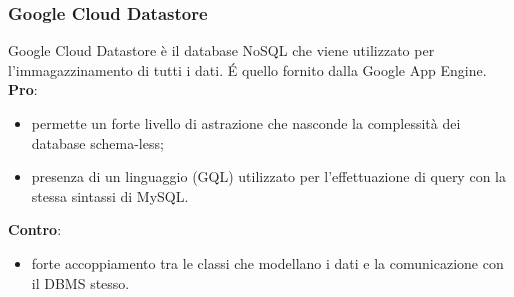 		\subsubsection{Google Cloud Datastore} %
		\label{ssub:datastore}
		Google Cloud Datastore è il database NoSQL che viene utilizzato per l'immagazzinamento di tutti i dati. \'E quello fornito dalla Google App Engine. \newline
		\textbf{Pro}:
			\begin{itemize}
				\item permette un forte livello di astrazione che nasconde la complessità dei database schema-less;
				\item presenza di un linguaggio (GQL) utilizzato per l'effettuazione di query con la stessa sintassi di MySQL.
			\end{itemize}
			\noindent
			\textbf{Contro}:
				\begin{itemize}
					\item forte accoppiamento tra le classi che modellano i dati e la comunicazione con il DBMS stesso.
				\end{itemize}
			\noindent


